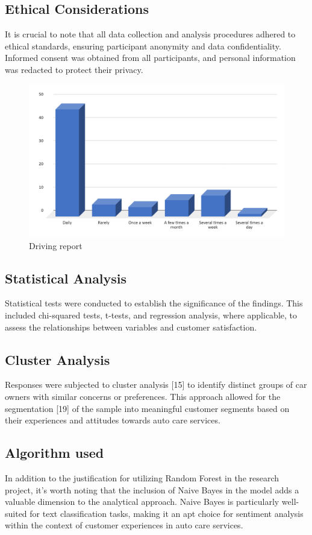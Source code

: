 \documentclass[conference]{IEEEtran}
\begin{document}
\subsection{Ethical Considerations}
It is crucial to note that all data collection and analysis procedures adhered to ethical standards, ensuring participant anonymity and data confidentiality. Informed consent was obtained from all participants, and personal information was redacted to protect their privacy. 
\begin{figure}[htbp]
\centering
\includegraphics[scale=0.2]{Fig2.png}
\caption{Driving report}
\label{fig}
\end{figure}
\subsection{Statistical Analysis}
Statistical tests were conducted to establish the significance of the findings. This included chi-squared tests, t-tests, and regression analysis, where applicable, to assess the relationships between variables and customer satisfaction. 
\subsection{Cluster Analysis} 
Responses were subjected to cluster analysis [15] to identify distinct groups of car owners with similar concerns or preferences. This approach allowed for the segmentation [19] of the sample into meaningful customer segments based on their experiences and attitudes towards auto care services. 
\subsection{Algorithm used}
In addition to the justification for utilizing Random Forest in the research project, it's worth noting that the inclusion of Naive Bayes in the model adds a valuable dimension to the analytical approach. Naive Bayes is particularly well-suited for text classification tasks, making it an apt choice for sentiment analysis within the context of customer experiences in auto care services. 
\end{document}
